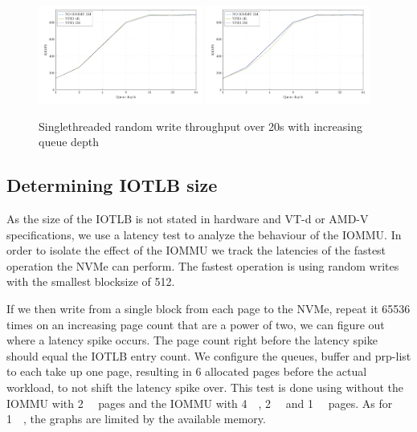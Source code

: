 \begin{figure}[H]
  \centering
   {\includegraphics[width=0.48\textwidth]{figures/qdnt1_1page}}
   {\includegraphics[width=0.48\textwidth]{figures/qdnt1_512page}}
  \caption{Singlethreaded random write throughput over 20s with increasing queue depth}
  \label{fig:qdnt1-4kib}
\end{figure}

\subsection{Determining IOTLB size}
As the size of the IOTLB is not stated in hardware and VT-d or AMD-V specifications, we use a latency test to analyze the behaviour of the IOMMU.
In order to isolate the effect of the IOMMU we track the latencies of the fastest operation the NVMe can perform. The fastest operation is using random writes with the smallest blocksize of \qty{512}{\byte}.

If we then write from a single block from each page to the NVMe, repeat it 65536 times on an increasing page count that are a power of two, we can figure out where a latency spike occurs. The page count right before the latency spike should equal the IOTLB entry count. We configure the queues, buffer and prp-list to each take up one page, resulting in 6 allocated pages before the actual workload, to not shift the latency spike over. This test is done using without the IOMMU with \qty{2}{\mebi\byte} pages and the IOMMU with \qty{4}{\kibi\byte}, \qty{2}{\mebi\byte} and \qty{1}{\gibi\byte} pages. As for \qty{1}{\gibi\byte}, the graphs are limited by the available memory.

